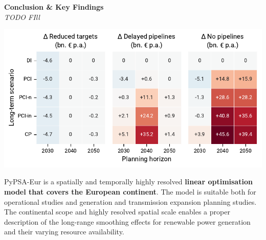 \documentclass[a0,portrait]{a0poster}
\begin{document}
\begin{multicols}{3}

\columnbreak
\noindent \textcolor{red100}{\huge \textbf{Conclusion \& Key Findings}}
\\
\textit{TODO FIll}
\\


\begin{center}
    \includegraphics[width=\linewidth]{regret_matrix.pdf}
    \label{fig:regret_matrix}
\end{center}
\vspace{2em}

\noindent
PyPSA-Eur is a spatially and temporally highly resolved \textbf{linear optimisation 
model that covers the European continent}. The model is suitable both for operational studies and 
generation and transmission expansion planning studies. The continental scope and 
highly resolved spatial scale enables a proper description of the long-range smoothing
effects for renewable power generation and their varying resource availability.


\end{multicols}
\end{document}
